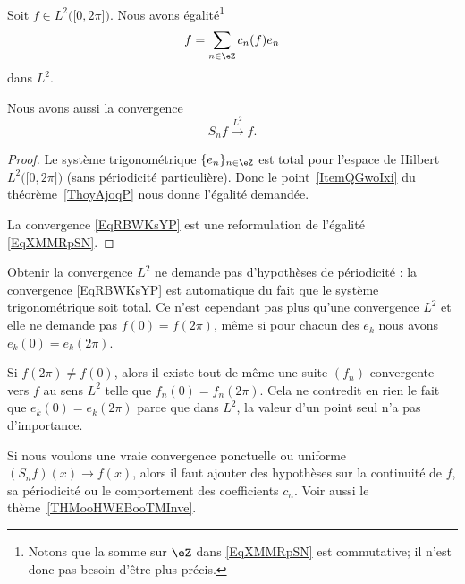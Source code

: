 \begin{theorem} \label{ThoYDKZLyv}
	Soit \( f\in L^2\big( \mathopen[ 0 , 2\pi \mathclose] \big)\). Nous avons égalité\footnote{Notons que la somme sur \( \eZ\) dans \eqref{EqXMMRpSN} est commutative; il n'est donc pas besoin d'être plus précis.}
	\begin{equation}    \label{EqXMMRpSN}
		f=\sum_{n\in \eZ}c_n(f)e_n
	\end{equation}
	dans \( L^2\).

	Nous avons aussi la convergence
	\begin{equation}    \label{EqRBWKsYP}
		S_nf\stackrel{L^2}{\to} f.
	\end{equation}
\end{theorem}

\begin{proof}
	Le système trigonométrique \( \{ e_n \}_{n\in \eZ}\) est total pour l'espace de Hilbert \( L^2\big( \mathopen[ 0 , 2\pi \mathclose] \big)\) (sans périodicité particulière). Donc le point~\ref{ItemQGwoIxi} du théorème~\ref{ThoyAjoqP} nous donne l'égalité demandée.

	La convergence \eqref{EqRBWKsYP} est une reformulation de l'égalité \eqref{EqXMMRpSN}.
\end{proof}

\begin{normaltext}
	Obtenir la convergence \( L^2\) ne demande pas d'hypothèses de périodicité : la convergence \eqref{EqRBWKsYP} est automatique du fait que le système trigonométrique soit total. Ce n'est cependant pas plus qu'une convergence \( L^2\) et elle ne demande pas \( f(0)=f(2\pi)\), même si pour chacun des \( e_k\) nous avons \( e_k(0)=e_k(2\pi)\).

	Si \( f(2\pi)\neq f(0)\), alors il existe tout de même une suite \( (f_n)\) convergente vers \( f\) au sens \( L^2\) telle que \( f_n(0)=f_n(2\pi)\). Cela ne contredit en rien le fait que \( e_k(0)=e_k(2\pi)\) parce que dans \( L^2\), la valeur d'un point seul n'a pas d'importance.

	Si nous voulons une vraie convergence ponctuelle ou uniforme \( (S_nf)(x)\to f(x)\), alors il faut ajouter des hypothèses sur la continuité de \( f\), sa périodicité ou le comportement des coefficients \( c_n\). Voir aussi le thème~\ref{THMooHWEBooTMInve}.
\end{normaltext}

